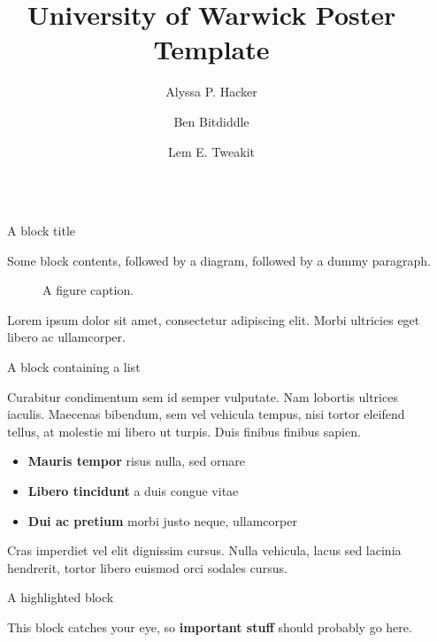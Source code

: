 \documentclass[final]{beamer}
\title{University of Warwick Poster Template}
\author{Alyssa P. Hacker \inst{1} \and Ben Bitdiddle \inst{2} \and Lem E. Tweakit \inst{2}}
\institute[shortinst]{\inst{1} Some Institute \samelineand \inst{2} Another Institute}
\newlength{\sepwidth}
\newlength{\colwidth}
\newcommand{\separatorcolumn}{\begin{column}{\sepwidth}\end{column}}
\begin{document}
\begin{frame}[t]
\begin{columns}[t]
\separatorcolumn

\begin{column}{\colwidth}

  \begin{block}{A block title}

    Some block contents, followed by a diagram, followed by a dummy paragraph.

    \begin{figure}
      \centering
      \caption{A figure caption.}
    \end{figure}

    Lorem ipsum dolor sit amet, consectetur adipiscing elit. Morbi ultricies
    eget libero ac ullamcorper.

  \end{block}

  \begin{block}{A block containing a list}

    Curabitur condimentum sem id semper vulputate. Nam lobortis ultrices
    iaculis. Maecenas bibendum, sem vel vehicula tempus, nisi tortor eleifend
    tellus, at molestie mi libero ut turpis. Duis finibus finibus sapien.

    \begin{itemize}
      \item \textbf{Mauris tempor} risus nulla, sed ornare
      \item \textbf{Libero tincidunt} a duis congue vitae
      \item \textbf{Dui ac pretium} morbi justo neque, ullamcorper
    \end{itemize}

    Cras imperdiet vel elit dignissim cursus. Nulla vehicula, lacus sed lacinia
    hendrerit, tortor libero euismod orci sodales cursus.

  \end{block}

  \begin{coralblock}{A highlighted block}

    This block catches your eye, so \textbf{important stuff} should probably go
    here.


\end{coralblock}
\end{column}
\end{columns}
\end{frame}
\end{document}

